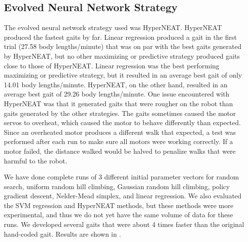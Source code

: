


\subsection{Evolved Neural Network Strategy}

The evolved neural network strategy used was HyperNEAT. HyperNEAT
produced the fastest gaits by far. Linear regression produced a gait
in the first trial (27.58 body lengths/minute) that was on par with
the best gaits generated by HyperNEAT, but no other maximizing or
predictive strategy produced gaits close to those of HyperNEAT. Linear
regression was the best performing maximizing or predictive strategy,
but it resulted in an average best gait of only 14.01 body
lengths/minute. HyperNEAT, on the other hand, resulted in an average
best gait of 29.26 body lengths/minute. One issue encountered with
HyperNEAT was that it generated gaits that were rougher on the robot
than gaits generated by the other strategies. The gaits sometimes
caused the motor servos to overheat, which caused the motor to behave
differently than expected. Since an overheated motor produces a
different walk that expected, a test was performed after each run to
make sure all motors were working correctly. If a motor failed, the
distance walked would be halved to penalize walks that were harmful to
the robot.


We have done complete runs of 3 different initial parameter vectors
for random search, uniform random hill climbing, Gaussian random hill
climbing, policy gradient descent, Nelder-Mead simplex, and linear
regression.  We also evaluated the SVM regression and HyperNEAT
methods, but these methods were more experimental, and thus we do not
yet have the same volume of data for these runs.  We developed several
gaits that were about 4 times faster than the original hand-coded
gait.  Results are shown in .



